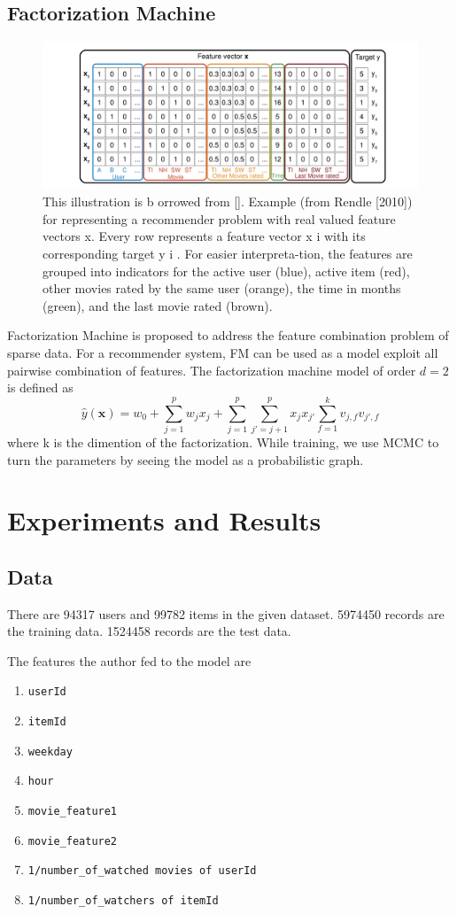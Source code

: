 \documentclass{article}
\begin{document}
\subsection{Factorization Machine}

\begin{figure}[!h]
	\centering
	\includegraphics[width=\textwidth]{figures/fig2.png}
	\caption{This illustration is b orrowed from []. Example (from Rendle [2010]) for representing a recommender problem with real valued feature vectors x. Every row represents a feature vector x i with its corresponding target y i . For easier interpreta-tion, the features are grouped into indicators for the active user (blue), active item (red), other movies rated by the same user (orange), the time in months (green), and the last movie rated (brown).}
\end{figure}
Factorization Machine is proposed to address the feature combination problem of sparse data. For a recommender system, FM can be used as a model exploit all pairwise combination of features. The factorization machine model of order $d=2$ is defined as 
\[\hat y(\bm x) = w_0 + \sum_{j=1}^{p}w_jx_j + \sum_{j=1}^{p}\sum_{j'=j+1}^{p}x_jx_{j'}\sum_{f=1}^{k}v_{j,f}v_{j',f}\]
where k is the dimention of the factorization. While training, we use MCMC to turn the parameters by seeing the model as a probabilistic graph.

\section{Experiments and Results}\label{sec:exps}
\subsection{Data}
There are 94317 users and 99782 items in the given dataset. 5974450 records are the training data. 1524458 records are the test data.

The features the author fed to the model are 
\begin{enumerate}
	\item \texttt{userId}
	\item \texttt{itemId}
	\item \texttt{weekday}
	\item \texttt{hour}
	\item \texttt{movie\_feature1}
	\item \texttt{movie\_feature2}
	\item \texttt{1/number\_of\_watched movies of userId}
	\item \texttt{1/number\_of\_watchers of itemId}
\end{enumerate}
\end{document}
